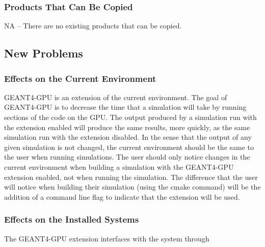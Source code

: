 \documentclass[12pt]{article}
\newcommand{\todo}[1]{\textcolor{red}{[TODO: #1]}} \else
\newcommand{\authornote}[3]{} \newcommand{\todo}[1]{} \fi
\newcommand{\ds}[1]{\authornote{blue}{DS}{#1}} %
\newcommand{\vr}[1]{\authornote{green}{VR}{#1}}
\begin{document}
\subsubsection{Products That Can Be Copied}
NA -- There are no existing products that can be copied.

\subsection{New Problems}\label{SubSec_NewProbs} %
\subsubsection{Effects on the Current Environment}
GEANT4-GPU is an extension of the current environment. The goal of GEANT4-GPU is to decrease the time that a simulation will take by running sections of the code on the GPU. The output produced by a simulation run with the extension enabled will produce the same results, more quickly, as the same simulation run with the extension disabled. In the sense that the output of any given simulation is not changed, the current environment should be the same to the user when running simulations. The user should only notice changes in the current environment when building a simulation with the GEANT4-GPU extension enabled, not when running the  simulation. The difference that the user will notice when building their simulation (using the cmake command) will be the addition of a command line flag to indicate that the extension will be used.
\ds{You are describing design decisions, not effects on the current environment}\vr{Changed section to describe how design decisions effect the current environment}

\subsubsection{Effects on the Installed Systems}
The GEANT4-GPU extension interfaces with the system through 
\ds{Again you are talking about design. Here you should be detailing what your
how your product interfaces with the existing system. Are there any potential
conflicts that would need to be solved (i.e. by your design decision)?}
\end{document}
